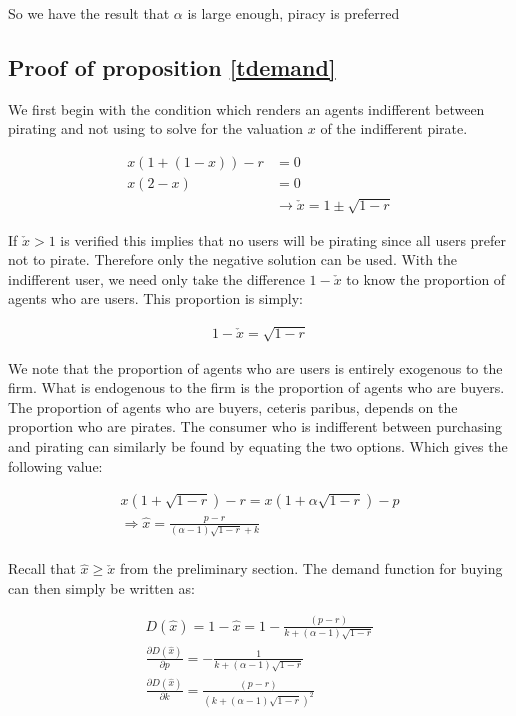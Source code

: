 \documentclass[12pt]{article}
\numberwithin{equation}{section}
\begin{document}
So we have the result that $\alpha$ is large enough, piracy is preferred



\subsection{Proof of proposition \ref{tdemand}}

\label{tdemandp}

We first begin with the condition which renders an agents indifferent between pirating and not using to solve for the valuation $x$ of the indifferent pirate. 


\begin{align*}
x(1+(1-x))-r&=0 \\
x(2-x)&=0 \\
&\rightarrow \check{x} = 1
\pm \sqrt{ 1 -r }
\end{align*}


If $\check{x}>1$ is verified this implies that no users will be pirating since all users prefer not to pirate. Therefore only the negative solution can be used.  With the indifferent user, we need only take the difference $1-\check{x}$ to know the proportion of agents who are users. This proportion is simply:

\begin{align*}
1-\check{x}=\sqrt{ 1 -r }
\end{align*}

We note that the proportion of agents who are users is entirely exogenous to the firm. What is endogenous to the firm is the proportion of agents who are buyers. The proportion of agents who are buyers, ceteris paribus, depends on the proportion who are pirates. The consumer who is indifferent between purchasing and pirating can similarly be found by equating the two options. Which gives the following value:

\begin{align*}
x(1+\sqrt{ 1 -r })-r=x(1+ \alpha \sqrt{ 1 -r } )-p \\
\Rightarrow \hat{x}=\frac{p-r}{(\alpha-1)\sqrt{ 1 -r }+k} \\
\end{align*}

Recall that $\hat{x} \geq \check{x}$ from the preliminary section. The demand function for buying can then simply be written as:

\begin{align*}
D(\hat{x})=1-\hat{x}=1-\frac{ (p-r)}{k + (\alpha-1) \sqrt{ 1 -r }} \\
\frac{\partial D(\hat{x})}{\partial p} =
-\frac{ 1}{k + (\alpha-1) \sqrt{ 1 -r }} \\
\frac{\partial D(\hat{x})}{\partial k} =
\frac{ (p-r) }{(k+
 (\alpha-1)\sqrt{ 1 - r }
)^2} 
\end{align*}
\end{document}
